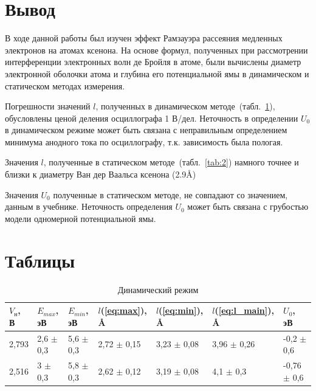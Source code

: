 \documentclass[reprint, nofootinbib, nobalancelastpage, 10pt]{revtex4-2}
\begin{document}
\newpage

\section*{Вывод}

В ходе данной работы был изучен эффект Рамзауэра рассеяния медленных электронов на атомах ксенона.
На основе формул, полученных при рассмотрении интерференции электронных волн де Бройля в атоме,
были вычислены диаметр электронной оболочки атома и глубина его потенциальной ямы в динамическом и
статическом методах измерения.

Погрешности значений $l$, полученных в динамическом методе~(табл.~\ref{tab:1}), обусловлены
ценой деления осциллографа 1 В/дел. Неточность в определении $U_0$ в динамическом режиме
может быть связана с неправильным определением минимума анодного тока по осциллографу, т.к.
зависимость была пологая.

Значения $l$, полученные в статическом методе~(табл.~\ref{tab:2}) намного точнее и близки
к диаметру Ван дер Ваальса ксенона (2.9\AA)

Значения $U_0$ полученные в статическом методе, не совпадают со значением, данным в учебнике.
Неточность определения $U_0$ может быть связана с грубостью модели одномерной потенциальной
ямы.

\newpage
\appendix

\onecolumngrid
\section{Таблицы}


\begin{table}[h!]
	\caption{Динамический режим}
	\label{tab:1}
	\begin{tabular}{|p{2cm}|p{2cm}|p{2cm}|p{2cm}|p{2cm}|p{2cm}|p{2cm}|}
		\hline
		$V_{\text{н}}$, В & $E_{max}$, эВ & $E_{min}$, эВ & $l$(\ref{eq:max}), \AA{} & $l$(\ref{eq:min}), \AA{} & $l$(\ref{eq:l_main}), \AA{} & $U_0$, эВ \\ \hline
		2,793 & 2,6 $\pm$  0,3 & 5,6 $\pm$ 0,3 & 2,72 $\pm$ 0,15 & 3,23 $\pm$ 0,08 & 3,96 $\pm$ 0,26 & -0,2 $\pm$ 0,6  \\ \hline
		2,516 & 3 $\pm$ 0,3   & 5,8 $\pm$ 0,3 & 2,62 $\pm$ 0,12 & 3,19 $\pm$ 0,08 & 4,1 $\pm$ 0,3   & -0,76 $\pm$ 0,6 \\ \hline
	\end{tabular}
\end{table}
\end{document}
